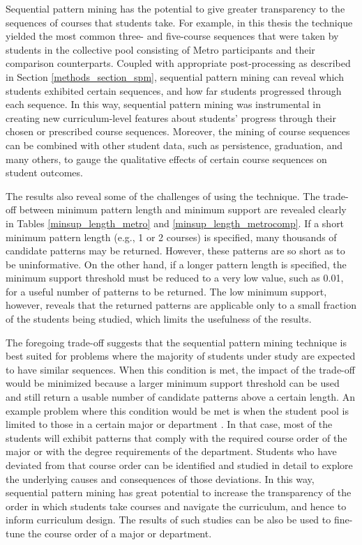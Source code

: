 Sequential pattern mining has the potential to give greater transparency to the sequences of courses that students take.  For example, in this thesis the technique yielded the most common three- and five-course sequences that were taken by students in the collective pool consisting of Metro participants and their comparison counterparts.   Coupled with appropriate post-processing as described in Section \ref{methods_section_spm}, sequential pattern mining can reveal which students exhibited certain sequences, and how far students progressed through each sequence.  In this way, sequential pattern mining was instrumental in creating new curriculum-level features about students' progress through their chosen or prescribed course sequences.  Moreover, the mining of course sequences can be combined with other student data, such as persistence, graduation, and many others, to gauge the qualitative effects of certain course sequences on student outcomes.

The results also reveal some of the challenges of using the technique.  The trade-off between minimum pattern length and minimum support are revealed clearly in Tables \ref{minsup_length_metro} and \ref{minsup_length_metrocomp}.  If a short minimum pattern length (e.g., 1 or 2 courses) is specified, many thousands of candidate patterns may be returned.  However, these patterns are so short as to be uninformative.  On the other hand, if a longer pattern length is specified, the minimum support threshold must be reduced to a very low value, such as 0.01, for a useful number of patterns to be returned.  The low minimum support, however, reveals that the returned patterns are applicable only to a small fraction of the students being studied, which limits the usefulness of the results.  

The foregoing trade-off suggests that the sequential pattern mining technique is best suited for problems where the majority of students under study are expected to have similar sequences.  When this condition is met, the impact of the trade-off would be minimized because a larger minimum support threshold can be used and still return a usable number of candidate patterns above a certain length.  An example problem where this condition would be met is when the student pool is limited to those in a certain major or department \cite{Campagni, Perera}.  In that case, most of the students will exhibit patterns that comply with the required course order of the major or with the degree requirements of the department.  Students who have deviated from that course order can be identified and studied in detail to explore the underlying causes and consequences of those deviations.  In this way, sequential pattern mining has great potential to increase the transparency of the order in which students take courses and navigate the curriculum, and hence to inform curriculum design. The results of such studies can be also be used to fine-tune the course order of a major or department.

